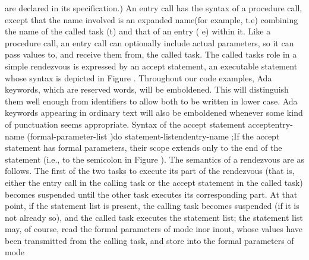 are declared in its specification.) An entry call has the syntax of
a procedure call, except that the name involved is an %
\txtxemph[]expanded name\txtxendemph[] (for example, %
\tyxffmxmono[]t.e\tyxffmxendmono[]) combining the name of the called
task (\tyxffmxmono[]t\tyxffmxendmono[]) and that of an entry (%
\tyxffmxmono[]e\tyxffmxendmono[]) within it. Like a procedure call,
an entry call can optionally include actual parameters, so it can
pass values to, and receive them from, the called task.%
\Endpara[]
\Para[]The called task\rsquo[]s role in a simple rendezvous is expressed
by an \txtxemph[]accept statement\txtxendemph[], an executable statement
whose syntax is depicted in Figure .%
\NtFoot[]\NtNtpar[]Throughout our code examples, Ada keywords, which
are reserved words, will be emboldened. This will distinguish them
well enough from identifiers to allow both to be written in lower
case. Ada keywords appearing in ordinary text will also be emboldened
whenever some kind of punctuation seems appropriate.%
\NtEndntpar[]\NtEndfoot[]
\Parbox[]
Syntax of the accept statement%
\FgEndcap[]
\Comp[]\tyxtstxbf[]accept\tyxtstxendbf[] \Symlt[]\tyxtstxit[]entry-name%
\tyxtstxendit[]\Symgt[] \Symlbk[](\Symlt[]\tyxtstxit[]formal-parameter-list%
\tyxtstxendit[]\Symgt[])\Symrbk[] \Symlbk[]\tyxtstxbf[]do%
\tyxtstxendbf[]
   \Symlt[]\tyxtstxit[]statement-list\tyxtstxendit[]\Symgt[]
\tyxtstxbf[]end\tyxtstxendbf[] \Symlbk[]\Symlt[]\tyxtstxit[]entry-name%
\tyxtstxendit[]\Symgt[]\Symrbk[]\Symrbk[];\Endcomp[]
\EndParbox[]
\FgEndblock[]
 If the accept statement has formal parameters, their scope extends
only to the end of the statement (i.e., to the semicolon in Figure
). The semantics of a rendezvous
are as follows. The first of the two tasks to execute its part of
the rendezvous (that is, either the entry call in the calling task
or the accept statement in the called task) becomes suspended until
the other task executes its corresponding part. At that point, if
the statement list is present, the calling task becomes suspended
(if it is not already so), and the called task executes the statement
list; the statement list may, of course, read the formal parameters
of mode \tyxffmxmono[]\tyxtstxbf[]in\tyxtstxendbf[]%
\tyxffmxendmono[] or \tyxffmxmono[]\tyxtstxbf[]in\tyxtstxendbf[]%
\tyxffmxendmono[] \tyxffmxmono[]\tyxtstxbf[]out\tyxtstxendbf[]%
\tyxffmxendmono[], whose values have been transmitted from the calling
task, and store into the formal parameters of mode %
